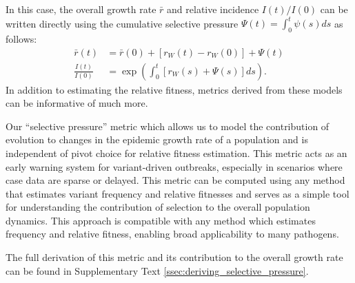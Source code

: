 \documentclass[11pt,oneside,letterpaper]{article}
\newcommand{\wt}{W}
\def\tbc#1{\textcolor{purple}{[#1]}}
\begin{document}
In this case, the overall growth rate $\bar{r}$ and relative incidence $I(t) / I(0)$ can be written directly using the cumulative selective pressure $\Psi(t) = \int_0^t \psi(s)ds$ as follows:
\begin{align}
    \bar{r}(t) &= \bar{r}(0) + [r_{\wt}(t) - r_{\wt}(0)] + \Psi(t)\\
    \frac{I(t)}{I(0)} &= \exp \left( \int_0^t [r_{\wt}(s) + \Psi(s)]ds \right).
\end{align}
In addition to estimating the relative fitness, metrics derived from these models can be informative of much more.

Our ``selective pressure'' metric which allows us to model the contribution of evolution to changes in the epidemic growth rate of a population and is independent of pivot choice for relative fitness estimation.
This metric acts as an early warning system for variant-driven outbreaks, especially in scenarios where case data are sparse or delayed.
This metric can be computed using any method that estimates variant frequency and relative fitnesses and serves as a simple tool for understanding the contribution of selection to the overall population dynamics.
This approach is compatible with any method which estimates frequency and relative fitness, enabling broad applicability to many pathogens.


The full derivation of this metric and its contribution to the overall growth rate can be found in Supplementary Text \ref{ssec:deriving_selective_pressure}.
\end{document}
